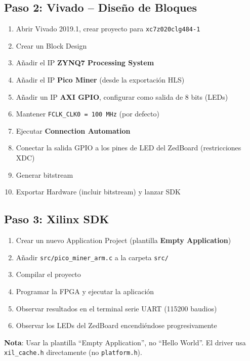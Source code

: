 \documentclass[12pt,a4paper]{article}
\begin{document}
\subsection{Paso 2: Vivado -- Dise\~no de Bloques}

\begin{enumerate}[leftmargin=2em]
    \item Abrir Vivado 2019.1, crear proyecto para \texttt{xc7z020clg484-1}
    \item Crear un Block Design
    \item A\~nadir el IP \textbf{ZYNQ7 Processing System}
    \item A\~nadir el IP \textbf{Pico Miner} (desde la exportaci\'on HLS)
    \item A\~nadir un IP \textbf{AXI GPIO}, configurar como salida de 8 bits (LEDs)
    \item Mantener \texttt{FCLK\_CLK0 = 100 MHz} (por defecto)
    \item Ejecutar \textbf{Connection Automation}
    \item Conectar la salida GPIO a los pines de LED del ZedBoard (restricciones XDC)
    \item Generar bitstream
    \item Exportar Hardware (incluir bitstream) y lanzar SDK
\end{enumerate}

\subsection{Paso 3: Xilinx SDK}

\begin{enumerate}[leftmargin=2em]
    \item Crear un nuevo Application Project (plantilla \textbf{Empty Application})
    \item A\~nadir \texttt{src/pico\_miner\_arm.c} a la carpeta \texttt{src/}
    \item Compilar el proyecto
    \item Programar la FPGA y ejecutar la aplicaci\'on
    \item Observar resultados en el terminal serie UART (115200 baudios)
    \item Observar los LEDs del ZedBoard encendi\'endose progresivamente
\end{enumerate}

\textbf{Nota}: Usar la plantilla ``Empty Application'', no ``Hello World''.
El driver usa \texttt{xil\_cache.h} directamente (no \texttt{platform.h}).
\end{document}
